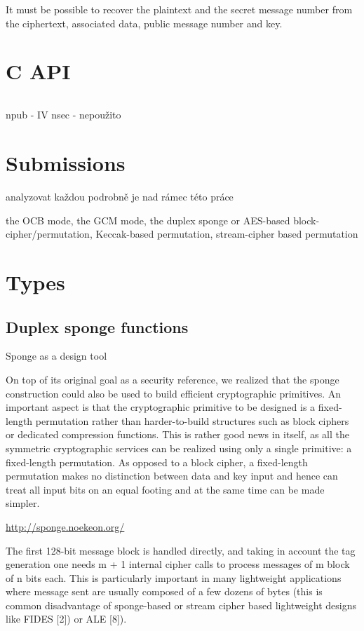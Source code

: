 It must be possible to recover the plaintext and the secret message number from the ciphertext, associated data, public message number and key.



\section{C API}
\label{toc/caesar-c-api}

\inputminted{c}{code/caesar-c-api.c}

npub - IV
nsec - nepoužito

\section{Submissions}

analyzovat každou podrobně je nad rámec této práce

the OCB mode, the GCM mode, the duplex sponge or AES-based block-cipher/permutation, Keccak-based permutation, stream-cipher based permutation

\section{Types}

\subsection{Duplex sponge functions}

Sponge as a design tool

On top of its original goal as a security reference, we realized that the sponge construction could also be used to build efficient cryptographic primitives. An important aspect is that the cryptographic primitive to be designed is a fixed-length permutation rather than harder-to-build structures such as block ciphers or dedicated compression functions. This is rather good news in itself, as all the symmetric cryptographic services can be realized using only a single primitive: a fixed-length permutation. As opposed to a block cipher, a fixed-length permutation makes no distinction between data and key input and hence can treat all input bits on an equal footing and at the same time can be made simpler.

\url{http://sponge.noekeon.org/}

The first 128-bit message block is handled directly, and taking in account the tag generation one needs m + 1 internal cipher calls to process messages of m block of n bits each. This is particularly important in many lightweight applications where message sent are usually composed of a few dozens of bytes (this is common disadvantage of sponge-based or stream cipher based lightweight designs like FIDES [2]) or ALE [8]).

